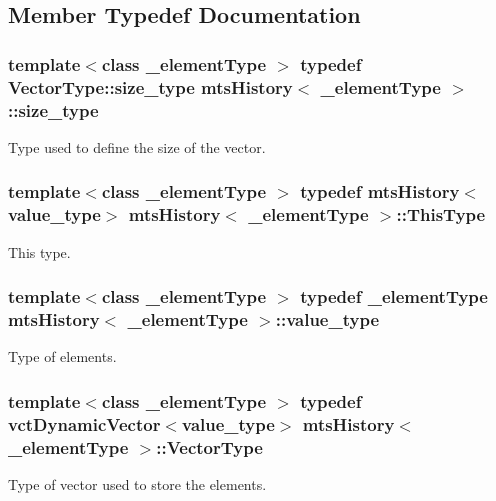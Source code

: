\subsection{Member Typedef Documentation}
\hypertarget{classmts_history_aca985b1dbd39cc61816674edc9aee0cc}{
\subsubsection[{size\-\_\-type}]{\setlength{\rightskip}{0pt plus 5cm}template$<$class \-\_\-element\-Type $>$ typedef Vector\-Type\-::size\-\_\-type {\bf mts\-History}$<$ \-\_\-element\-Type $>$\-::{\bf size\-\_\-type}}}\label{classmts_history_aca985b1dbd39cc61816674edc9aee0cc}
Type used to define the size of the vector. \hypertarget{classmts_history_aacbd58dfe7cfbae30858ab99557ee181}{
\subsubsection[{This\-Type}]{\setlength{\rightskip}{0pt plus 5cm}template$<$class \-\_\-element\-Type $>$ typedef {\bf mts\-History}$<${\bf value\-\_\-type}$>$ {\bf mts\-History}$<$ \-\_\-element\-Type $>$\-::{\bf This\-Type}}}\label{classmts_history_aacbd58dfe7cfbae30858ab99557ee181}
This type. \hypertarget{classmts_history_a83c4704404e2b71933b53c184bf72e8f}{
\subsubsection[{value\-\_\-type}]{\setlength{\rightskip}{0pt plus 5cm}template$<$class \-\_\-element\-Type $>$ typedef \-\_\-element\-Type {\bf mts\-History}$<$ \-\_\-element\-Type $>$\-::{\bf value\-\_\-type}}}\label{classmts_history_a83c4704404e2b71933b53c184bf72e8f}
Type of elements. \hypertarget{classmts_history_a7ccb818e85025368eb6ccdb5423453a3}{
\subsubsection[{Vector\-Type}]{\setlength{\rightskip}{0pt plus 5cm}template$<$class \-\_\-element\-Type $>$ typedef {\bf vct\-Dynamic\-Vector}$<${\bf value\-\_\-type}$>$ {\bf mts\-History}$<$ \-\_\-element\-Type $>$\-::{\bf Vector\-Type}}}\label{classmts_history_a7ccb818e85025368eb6ccdb5423453a3}
Type of vector used to store the elements. 

